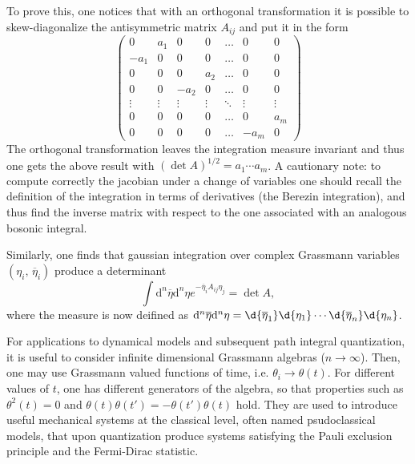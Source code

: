 To prove this, one notices that with an orthogonal transformation it is possible to skew-diagonalize the antisymmetric matrix \(A_{ij}\) and put it in the form
\[
    \begin{pmatrix}
        0      & a_1    & 0      & 0      & \dots  & 0      & 0      \\
        -a_1   & 0      & 0      & 0      & \dots  & 0      & 0      \\
        0      & 0      & 0      & a_2    & \dots  & 0      & 0      \\
        0      & 0      & -a_2   & 0      & \dots  & 0      & 0      \\
        \vdots & \vdots & \vdots & \vdots & \ddots & \vdots & \vdots \\
        0      & 0      & 0      & 0      & \dots  & 0      & a_m    \\
        0      & 0      & 0      & 0      & \dots  & -a_m   & 0
    \end{pmatrix}
\]
The orthogonal transformation leaves the integration measure invariant and thus one gets the above result with \((\det A)^{1 / 2} = a_1 \cdots a_m \). A cautionary note: to compute correctly the jacobian under a change of variables one should recall the definition of the integration in terms of derivatives (the Berezin integration), and thus find the inverse matrix with respect to the one associated with an analogous bosonic integral.

Similarly, one finds that gaussian integration over complex Grassmann variables \((\eta_i,\, \overline{\eta}_i)\) produce a determinant
\[
    \int \mathrm{d}^n\overline{\eta} \mathrm{d}^n\eta e^{-\overline{\eta}_i A_{ij} \eta_j} = \det A,
\]
where the measure is now deifined as \(\mathrm{d}^n\overline{\eta} \mathrm{d}^n\eta = \d{\overline{\eta}_1}\d{\eta_1} \cdots \d{\overline{\eta}_n}\d{\eta_n}\).

For applications to dynamical models and subsequent path integral quantization, it is useful to consider infinite dimensional Grassmann algebras (\(n \to \infty\)). Then, one may use Grassmann valued functions of time, i.e. \(\theta_i \to \theta(t)\). For different values of \(t\), one has different generators of the algebra, so that properties such as \(\theta^2(t) = 0\) and \(\theta(t) \theta(t') = - \theta(t') \theta(t)\) hold. They are used to introduce useful mechanical systems at the classical level, often named psudoclassical models, that upon quantization produce systems satisfying the Pauli exclusion principle and the Fermi-Dirac statistic.

